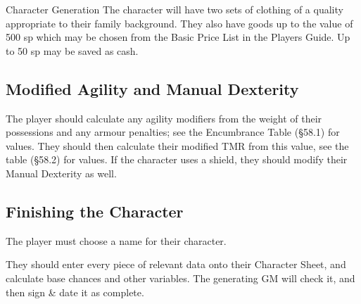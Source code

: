 \begin{Chapter}{Character Generation}
The character will have two sets of clothing of a quality appropriate
to their family background.  They also have goods up to the value of
500 sp which may be chosen from the Basic Price List in the Players
Guide.  Up to 50 sp may be saved as cash.

\subsection{Modified Agility and Manual Dexterity}

The player should  calculate any agility modifiers from  the weight of
their possessions and any armour  penalties; see the Encumbrance Table
(§58.1) for  values.  They  should then  calculate their  modified TMR
from this value,  see the table (§58.2) for values.   If the character
uses a shield, they should modify their Manual Dexterity as well.

\subsection{Finishing the Character}

The player must choose a name for their character. 

They should enter every piece of relevant data onto their Character
Sheet, and calculate base chances and other variables. The generating
GM will check it, and then sign \& date it as complete.

\end{Chapter}
